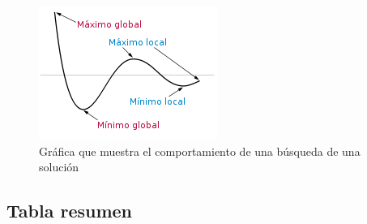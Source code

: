\documentclass{article}
\begin{document}
\begin{figure}[h]
	\centering
	\includegraphics[scale=0.5]{MinLocal.png}
	\caption{Gráfica que muestra el comportamiento de una búsqueda de una solución}
\end{figure}


\subsection{Tabla resumen}
\end{document}
